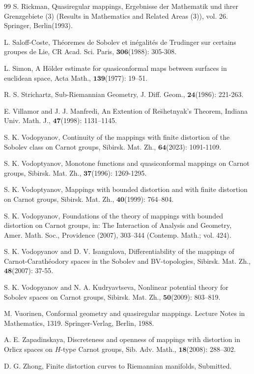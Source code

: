 \documentclass[11pt,twoside]{article}
\theoremstyle{definition}
\theoremstyle{remark}
\begin{document}
\begin{thebibliography}{99}
S. Rickman, Quasiregular mappings, Ergebnisse der Mathematik und ihrer Grenzgebiete (3) (Results in Mathematics and Related Areas (3)), vol. 26. Springer, Berlin(1993).


L. Saloff-Coste, Th\'{e}oremes de Sobolev et in\'{e}galit\'{e}s de Trudinger sur certains groupes de Lie, CR Acad. Sci. Paris, $\mathbf{306}$(1988): 305-308.


L. Simon, A H\"{o}lder estimate for quasiconformal maps between surfaces in euclidean space, Acta Math., $\mathbf{139}$(1977): 19–51.

R. S. Strichartz,  Sub-Riemannian Geometry, J. Diff. Geom., $\mathbf{24}$(1986): 221-263. 



E. Villamor and J. J. Manfredi, An Extention of Re\u{s}hetnyak’s Theorem, Indiana Univ. Math. J.,  $\mathbf{47}$(1998): 1131–1145.

S. K. Vodopyanov,  Continuity of the mappings with finite distortion of the Sobolev class on Carnot groups, Sibirsk. Mat. Zh., $\mathbf{64}$(2023): 1091-1109.


S. K. Vodoptyanov, Monotone functions and quasiconformal mappings on Carnot groups, Sibirsk. Mat. Zh., $\mathbf{37}$(1996): 1269-1295.

S. K. Vodoptyanov,  Mappings with bounded distortion and with finite distortion on Carnot groups, Sibirsk. Mat. Zh., $\mathbf{40}$(1999): 764–804.


 S. K. Vodopyanov, Foundations of the theory of mappings with bounded distortion on Carnot groups, in: The Interaction of Analysis and Geometry, Amer. Math. Soc., Providence (2007), 303–344 (Contemp. Math.; vol. 424).

S. K. Vodopyanov and D. V. Isangulova,  Differentiability of the mappings of Carnot-Carath\'{e}odory spaces in the Sobolev and BV-topologies, Sibirsk. Mat. Zh., $\mathbf{48}$(2007): 37-55.


S. K. Vodopyanov and N. A. Kudryavtseva, Nonlinear potential theory for Sobolev spaces on Carnot groups, Sibirsk. Mat. Zh., $\mathbf{50}$(2009): 803–819. 



 M. Vuorinen, Conformal geometry and quasiregular mappings. Lecture Notes in Mathematics, 1319. Springer-Verlag, Berlin, 1988.




 A. E. Zapadinskaya, Discreteness and openness of mappings with distortion in Orlicz spaces on $H$-type Carnot groups, Sib. Adv. Math., $\mathbf{18}$(2008): 288–302. 


D. G. Zhong, Finite distortion curves to Riemannian manifolds, Submitted.

\end{thebibliography}
\end{document}
